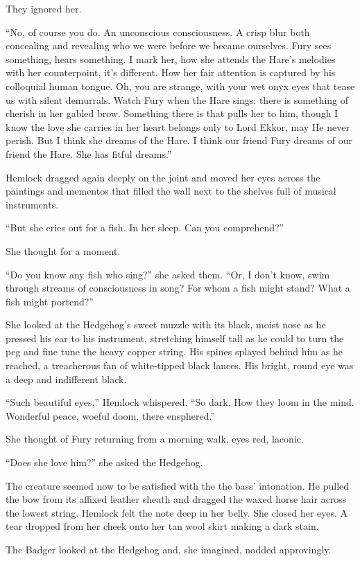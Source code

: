 \documentclass[11pt,a5paper]{article}
\begin{document}
They ignored her.

``No, of course you do. An unconscious consciousness. A crisp blur both concealing and revealing who we were before we became ourselves. Fury sees something, hears something. I mark her, how she attends the Hare's melodies with her counterpoint, it's different. How her fair attention is captured by his colloquial human tongue. Oh, you are strange, with your wet onyx eyes that tease us with silent demurrals. Watch Fury when the Hare sings: there is something of cherish in her gabled brow. Something there is that pulls her to him, though I know the love she carries in her heart belongs only to Lord Ekkor, may He never perish. But I think she dreams of the Hare. I think our friend Fury dreams of our friend the Hare. She has fitful dreams.''

Hemlock dragged again deeply on the joint and moved her eyes across the paintings and mementos that filled the wall next to the shelves full of musical instruments.

``But she cries out for a fish. In her sleep. Can you comprehend?''

She thought for a moment.

``Do you know any fish who sing?'' she asked them. ``Or, I don't know, swim through streams of consciousness in song? For whom a fish might stand? What a fish might portend?''

She looked at the Hedgehog's sweet muzzle with its black, moist nose as he pressed his ear to his instrument, stretching himself tall as he could to turn the peg and fine tune the heavy copper string. His spines splayed behind him as he reached, a treacherous fan of white-tipped black lances. His bright, round eye was a deep and indifferent black.

``Such beautiful eyes,'' Hemlock whispered. ``So dark. How they loom in the mind. Wonderful peace, woeful doom, there ensphered.''

She thought of Fury returning from a morning walk, eyes red, laconic.

``Does she love him?'' she asked the Hedgehog.

The creature seemed now to be satisfied with the the bass' intonation. He pulled the bow from its affixed leather sheath and dragged the waxed horse hair across the lowest string. Hemlock felt the note deep in her belly. She closed her eyes. A tear dropped from her cheek onto her tan wool skirt making a dark stain.

The Badger looked at the Hedgehog and, she imagined, nodded approvingly.
\end{document}

